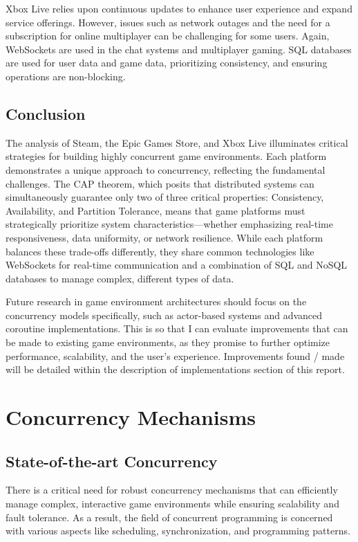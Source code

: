 \documentclass[]{final}
\begin{document}
Xbox Live relies upon continuous updates to enhance user experience and
expand service offerings. However, issues such as network outages and the need
for a subscription for online multiplayer can be challenging for some users.
Again, WebSockets are used in the chat systems and multiplayer gaming.
SQL databases are used for user data and game data,\cite{woolsey_how_2024}
prioritizing consistency, and ensuring operations are non-blocking.


\section{Conclusion}

The analysis of Steam, the Epic Games Store, and Xbox Live illuminates
critical strategies for building highly concurrent game environments. Each platform
demonstrates a unique approach to concurrency, reflecting the fundamental challenges.
The CAP theorem, which posits that distributed systems can
simultaneously guarantee only two of three critical properties: Consistency,
Availability, and Partition Tolerance, means that game platforms must
strategically prioritize system characteristics—whether emphasizing real-time
responsiveness, data uniformity, or network resilience.
\cite{gilbert_perspectives_2012} While each platform balances these
trade-offs differently, they share common technologies like WebSockets for real-time
communication and a combination of SQL and NoSQL databases to manage complex,
different types of data.

Future research in game environment architectures should focus
on the concurrency models specifically, such as actor-based systems and advanced coroutine
implementations. This is so that I can evaluate improvements that can be made to
existing game environments, as they promise to further optimize performance, scalability,
and the user's experience. Improvements found / made will be detailed within
the description of implementations section of this report.

\chapter{Concurrency Mechanisms}
\section{State-of-the-art Concurrency}

There is a critical need for robust concurrency mechanisms that can efficiently
manage complex, interactive game environments while ensuring scalability
and fault tolerance. As a result, the field of concurrent programming is concerned
with various aspects like scheduling, synchronization, and programming patterns.
\end{document}
